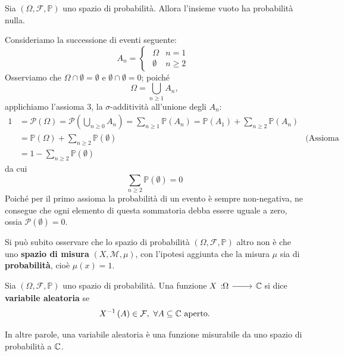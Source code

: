 \begin{proposition}
	Sia $\left(\Omega,\mathcal{F},\mathbb{P}\right)$ uno spazio di probabilità. Allora l'insieme vuoto ha probabilità nulla.
\end{proposition}
\begin{demonstration}
	Consideriamo la successione di eventi seguente:
	\begin{equation*}
		A_n=\begin{cases}
			\begin{array}{ll}
				\Omega&n=1\\
				\emptyset&n\geq2
			\end{array}
		\end{cases}
	\end{equation*}
	Osserviamo che $\Omega\cap \emptyset=\emptyset$ e $\emptyset\cap\emptyset=0$; poiché
	\begin{equation*}
		\Omega=\bigcup_{n\geq 1}A_n,
	\end{equation*}
	applichiamo l'assioma 3, la $\sigma$-additività all'unione degli $A_n$:
	\begin{align*}
		1&=\mathcal{P}\left(\Omega\right)=\mathcal{P}\left(\bigcup_{n\geq 0}A_n\right)=\sum_{n\geq 1}\mathbb{P}\left(A_n\right)=\mathbb{P}\left(A_1\right)+\sum_{n\geq2}\mathbb{P}\left(A_n\right)&\\
		&=\mathbb{P}\left(\Omega\right)+\sum_{n\geq 2}\mathbb{P}\left(\emptyset\right)&\text{(Assioma 1)}\\
		&=1-\sum_{n\geq 2}\mathbb{P}\left(\emptyset\right)&
	\end{align*}
	da cui
	\begin{equation*}
		\sum_{n\geq 2}\mathbb{P}\left(\emptyset\right)=0
	\end{equation*}
	Poiché per il primo assioma la probabilità di un evento è sempre non-negativa, ne consegue che ogni elemento di questa sommatoria debba essere uguale a zero, ossia $\mathcal{P}\left(\emptyset\right)=0$.
\end{demonstration}
Si può subito osservare che lo spazio di probabilità $\left(\Omega,\mathcal{F},\mathbb{P}\right)$ altro non è che uno \textbf{spazio di misura} $\left(X,\mathcal{M},\mu\right)$, con l'ipotesi aggiunta che la misura $\mu$ sia di \textbf{probabilità}, cioè $\mu(x)=1$.
\begin{define}
	Sia $\left(\Omega,\mathcal{F},\mathbb{P}\right)$ uno spazio di probabilità. Una funzione $\funz{X}{\Omega}{\complexset}$ si dice \textbf{variabile aleatoria} se \begin{equation}
		X^{-1}\left(A\right)\in\mathcal{F},\ \forall A\subseteq \mathbb{C}\text{ aperto.}
	\end{equation}
\end{define}
In altre parole, una variabile aleatoria è una funzione misurabile da uno spazio di probabilità a $\mathbb{C}$.
